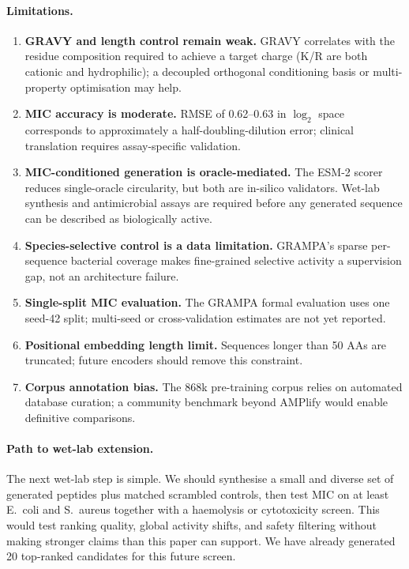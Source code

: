 \paragraph{Limitations.}
\begin{enumerate}[noitemsep]
  \item \textbf{GRAVY and length control remain weak.}
        GRAVY correlates with the residue composition required to achieve a
        target charge (K/R are both cationic and hydrophilic); a decoupled
        orthogonal conditioning basis or multi-property optimisation may help.
  \item \textbf{MIC accuracy is moderate.}
        RMSE of 0.62--0.63 in $\log_2$ space corresponds to approximately a
        half-doubling-dilution error; clinical translation requires
        assay-specific validation.
  \item \textbf{MIC-conditioned generation is oracle-mediated.}
        The ESM-2 scorer reduces single-oracle circularity, but both are
        in-silico validators. Wet-lab synthesis and antimicrobial assays are
        required before any generated sequence can be described as
        biologically active.
  \item \textbf{Species-selective control is a data limitation.}
        GRAMPA's sparse per-sequence bacterial coverage makes fine-grained
        selective activity a supervision gap, not an architecture failure.
  \item \textbf{Single-split MIC evaluation.}
        The GRAMPA formal evaluation uses one seed-42 split; multi-seed
        or cross-validation estimates are not yet reported.
  \item \textbf{Positional embedding length limit.}
        Sequences longer than 50 AAs are truncated; future encoders should
        remove this constraint.
  \item \textbf{Corpus annotation bias.}
        The 868k pre-training corpus relies on automated database curation;
        a community benchmark beyond AMPlify would enable definitive comparisons.
\end{enumerate}

\paragraph{Path to wet-lab extension.}
The next wet-lab step is simple.
We should synthesise a small and diverse set of generated peptides plus matched
scrambled controls, then test MIC on at least E.~coli and S.~aureus together
with a haemolysis or cytotoxicity screen.
This would test ranking quality, global activity shifts, and safety filtering
without making stronger claims than this paper can support.
We have already generated 20 top-ranked candidates for this future screen.

